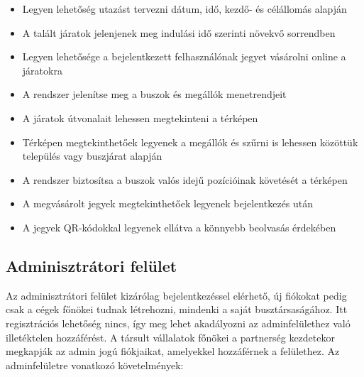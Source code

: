 \begin{itemize}
  \item Legyen lehetőség utazást tervezni dátum, idő, kezdő- és célállomás alapján
  \item A talált járatok jelenjenek meg indulási idő szerinti növekvő sorrendben
  \item Legyen lehetősége a bejelentkezett felhasználónak jegyet vásárolni online a járatokra
  \item A rendszer jelenítse meg a buszok és megállók menetrendjeit
  \item A járatok útvonalait lehessen megtekinteni a térképen
  \item Térképen megtekinthetőek legyenek a megállók és szűrni is lehessen közöttük település vagy buszjárat alapján
  \item A rendszer biztosítsa a buszok valós idejű pozícióinak követését a térképen
  \item A megvásárolt jegyek megtekinthetőek legyenek bejelentkezés után
  \item A jegyek QR-kódokkal legyenek ellátva a könnyebb beolvasás érdekében
\end{itemize}

\subsection{Adminisztrátori felület}
Az adminisztrátori felület kizárólag bejelentkezéssel elérhető, új fiókokat pedig csak a cégek főnökei tudnak létrehozni, mindenki a saját busztársaságához. Itt regisztrációs lehetőség nincs, így meg lehet akadályozni az adminfelülethez való illetéktelen hozzáférést. A társult vállalatok főnökei a partnerség kezdetekor megkapják az admin jogú fiókjaikat, amelyekkel hozzáférnek a felülethez. Az adminfelületre vonatkozó követelmények:

